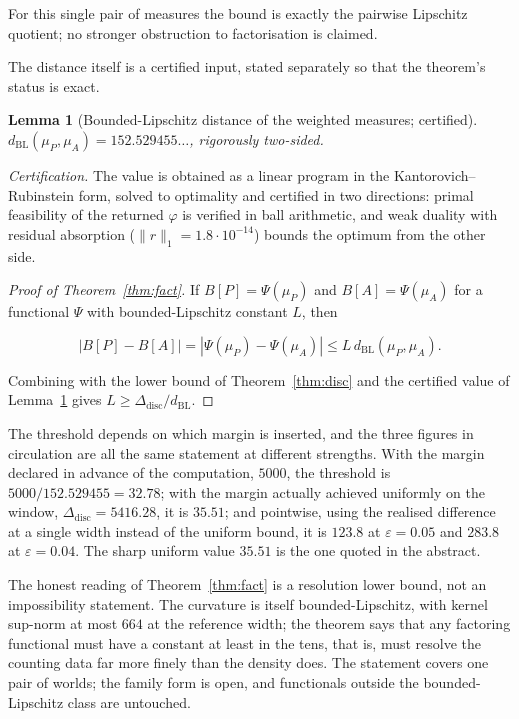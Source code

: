 \documentclass[11pt]{article}
\newtheorem{lemma}[theorem]{Lemma}
\newcommand{\dBL}{d_{\mathrm{BL}}}              %
\newcommand{\Ddisc}{\Delta_{\mathrm{disc}}}     %
\begin{document}
For this single pair of measures the bound is exactly the pairwise
Lipschitz quotient; no stronger obstruction to factorisation is claimed.

The distance itself is a certified input, stated separately so that the
theorem's status is exact.

\begin{lemma}[Bounded-Lipschitz distance of the weighted measures;
certified]
\label{lem:dbl}
$\dBL(\mu_P,\mu_A)=152.529455\ldots$, rigorously two-sided.
\end{lemma}

\emph{Certification.} The value is obtained as a linear program in the
Kantorovich--Rubinstein form, solved to optimality and certified in two
directions: primal feasibility of the returned $\varphi$ is verified in ball
arithmetic, and weak duality with residual absorption
($\|r\|_1=1.8\cdot10^{-14}$) bounds the optimum from the other side.

\begin{proof}[Proof of Theorem~\ref{thm:fact}]
If $B[P]=\Psi(\mu_P)$ and $B[A]=\Psi(\mu_A)$ for a functional $\Psi$ with
bounded-Lipschitz constant $L$, then

\[
|B[P]-B[A]|=|\Psi(\mu_P)-\Psi(\mu_A)|\le L\,\dBL(\mu_P,\mu_A).
\]

Combining with the lower bound of Theorem~\ref{thm:disc} and the certified
value of Lemma~\ref{lem:dbl} gives $L\ge\Ddisc/\dBL$.
\end{proof}

The threshold depends on which margin is inserted, and the three figures in
circulation are all the same statement at different strengths. With the margin
declared in advance of the computation, $5000$, the threshold is
$5000/152.529455=32.78$; with the margin actually achieved uniformly on the
window, $\Ddisc=5416.28$, it is $35.51$; and pointwise, using the realised
difference at a single width instead of the uniform bound, it is $123.8$ at
$\varepsilon=0.05$ and $283.8$ at $\varepsilon=0.04$. The sharp uniform value
$35.51$ is the one quoted in the abstract.

The honest reading of Theorem~\ref{thm:fact} is a resolution lower bound, not
an impossibility statement. The curvature is itself bounded-Lipschitz, with
kernel sup-norm at most $664$ at the reference width; the theorem says that
any factoring functional must have a constant at least in the tens, that is,
must resolve the counting data far more finely than the density does. The
statement covers one pair of worlds; the family form is open, and functionals
outside the bounded-Lipschitz class are untouched.
\end{document}
